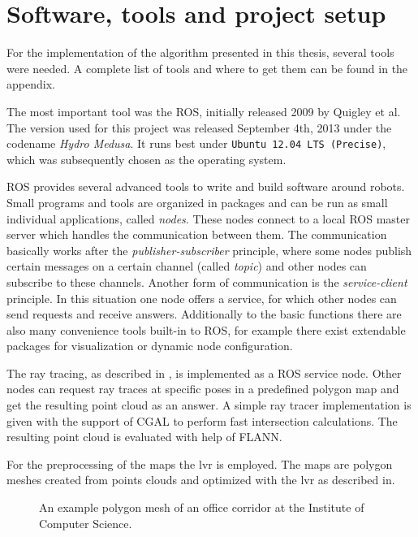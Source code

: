 \documentclass[Thesis.tex]{subfiles}
\begin{document}
\chapter{Software, tools and project setup}
For the implementation of the algorithm presented in this thesis, several tools were needed. A complete list of tools and where to get them can be found in the appendix.

\smallskip

The most important tool was the \gls{ROS}, initially released 2009 by Quigley et al.\cite{ros:2009} The version used for this project was released September 4th, 2013 under the codename \emph{Hydro Medusa}. It runs best under \texttt{Ubuntu 12.04 LTS (Precise)}, which was subsequently chosen as the operating system. 

\gls{ROS} provides several advanced tools to write and build software around robots. Small programs and tools are organized in packages and can be run as small individual applications, called \emph{nodes}. These nodes connect to a local \gls{ROS} master server which handles the communication between them. The communication basically works after the \emph{publisher-subscriber} principle, where some nodes publish certain messages on a certain channel (called \emph{topic}) and other nodes can subscribe to these channels.
Another form of communication is the \emph{service-client} principle. In this situation one node offers a service, for which other nodes can send requests and receive answers. Additionally to the basic functions there are also many convenience tools built-in to \gls{ROS}, for example there exist extendable packages for visualization or dynamic node configuration.

\smallskip

The ray tracing, as described in , is implemented as a \gls{ROS} service node. Other nodes can request ray traces at specific poses in a predefined polygon map and get the resulting point cloud as an answer. A simple ray tracer implementation is given with the support of \gls{CGAL} to perform fast intersection calculations. The resulting point cloud is evaluated with help of \gls{FLANN}. 

For the preprocessing of the maps the \gls{lvr} is employed. The maps are polygon meshes created from points clouds and optimized with the \gls{lvr} as described in\cite{Wiemann:2013}.

\begin{figure}%
\caption[Example polygon mesh]{An example polygon mesh of an office corridor at the Institute of Computer Science.}%
\label{fig:examplemap}%
\end{figure}
\end{document}

